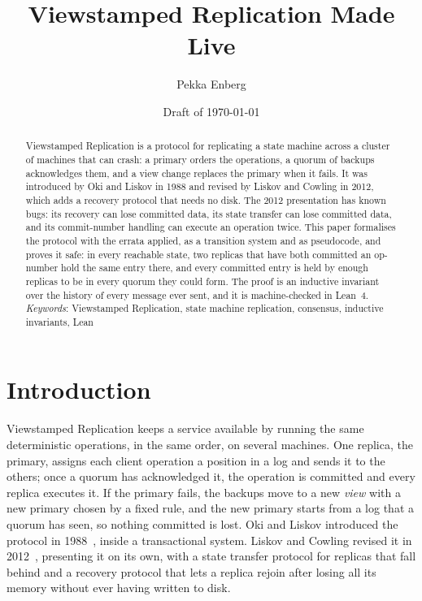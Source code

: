 \documentclass[11pt,a4paper]{article}
\title{Viewstamped Replication Made Live}
\author{Pekka Enberg}
\date{Draft of \today}
\theoremstyle{plain}
\theoremstyle{definition}
\theoremstyle{remark}
\begin{document}
\maketitle

\begin{abstract}
\noindent
Viewstamped Replication is a protocol for replicating a state machine
across a cluster of machines that can crash: a primary orders the
operations, a quorum of backups acknowledges them, and a view change
replaces the primary when it fails. It was introduced by Oki and Liskov
in 1988 and revised by Liskov and Cowling in 2012, which adds a recovery
protocol that needs no disk. The 2012 presentation has known bugs: its recovery can lose
committed data, its state transfer can lose committed data, and its
commit-number handling can execute an operation twice. This paper
formalises the protocol with the errata applied, as a transition system
and as pseudocode, and proves it safe: in every reachable state, two
replicas that have both committed an op-number hold the same entry
there, and every committed entry is held by enough replicas to be in
every quorum they could form. The proof is an inductive invariant over
the history of every message ever sent, and it is machine-checked in
Lean~4.
\\[6pt]
\textit{Keywords}: Viewstamped Replication, state machine replication,
consensus, inductive invariants, Lean
\end{abstract}

\section{Introduction}
\label{sec:intro}

Viewstamped Replication keeps a service available by running the same
deterministic operations, in the same order, on several machines. One
replica, the primary, assigns each client operation a position in a log
and sends it to the others; once a quorum has acknowledged it, the
operation is committed and every replica executes it. If the primary
fails, the backups move to a new \emph{view} with a new primary chosen
by a fixed rule, and the new primary starts from a log that a quorum has
seen, so nothing committed is lost. Oki and Liskov introduced the
protocol in 1988~\citep{oki1988vr}, inside a transactional system. Liskov
and Cowling revised it in 2012~\citep{liskov2012vr}, presenting it on its
own, with a state transfer protocol for replicas that fall behind and a
recovery protocol that lets a replica rejoin after losing all its memory
without ever having written to disk.
\end{document}
